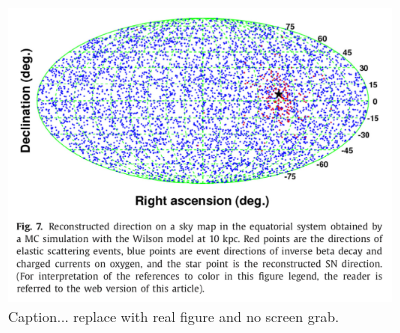 \documentclass[12pt, letterpaper]{article}
\begin{document}
\begin{figure}
  \begin{center}
    \includegraphics[width=4.0in]{SK-realtime-monitor-pointing}
    \caption{Caption... replace with real figure and no screen grab.}
    \label{fig:SK-realtime-monitor-pointing}
  \end{center}
\end{figure}
\end{document}
